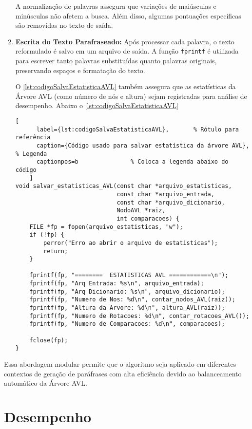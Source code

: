 \documentclass[a4paper, 12pt, english]{article}
\begin{document}
\begin{enumerate}
A normalização de palavras assegura que variações de maiúsculas e minúsculas não afetem a busca. Além disso, algumas pontuações específicas são removidas no texto de saída.

\item \textbf{Escrita do Texto Parafraseado:}
Após processar cada palavra, o texto reformulado é salvo em um arquivo de saída. A função \texttt{fprintf} é utilizada para escrever tanto palavras substituídas quanto palavras originais, preservando espaços e formatação do texto.

\newpage

O \autoref{lst:codigoSalvaEstatisticaAVL} também assegura que as estatísticas da Árvore AVL (como número de nós e altura) sejam registradas para análise de desempenho.
Abaixo o \autoref{lst:codigoSalvaEstatisticaAVL}

    \begin{lstlisting}[
      label={lst:codigoSalvaEstatisticaAVL},       % Rótulo para referência
      caption={Código usado para salvar estatística da árvore AVL}, % Legenda
      captionpos=b               % Coloca a legenda abaixo do código
    ]
void salvar_estatisticas_AVL(const char *arquivo_estatisticas,
                             const char *arquivo_entrada,
                             const char *arquivo_dicionario,
                             NodoAVL *raiz,
                             int comparacoes) {
    FILE *fp = fopen(arquivo_estatisticas, "w");
    if (!fp) {
        perror("Erro ao abrir o arquivo de estatisticas");
        return;
    }

    fprintf(fp, "========  ESTATISTICAS AVL ============\n");
    fprintf(fp, "Arq Entrada: %s\n", arquivo_entrada);
    fprintf(fp, "Arq Dicionario: %s\n", arquivo_dicionario);
    fprintf(fp, "Numero de Nos: %d\n", contar_nodos_AVL(raiz));
    fprintf(fp, "Altura da Arvore: %d\n", altura_AVL(raiz));
    fprintf(fp, "Numero de Rotacoes: %d\n", contar_rotacoes_AVL());
    fprintf(fp, "Numero de Comparacoes: %d\n", comparacoes);

    fclose(fp);
}
\end{lstlisting}

\end{enumerate}
Essa abordagem modular permite que o algoritmo seja aplicado em diferentes contextos de geração de paráfrases com alta eficiência devido ao balanceamento automático da Árvore AVL.

\newpage

\section{Desempenho}
\end{document}
